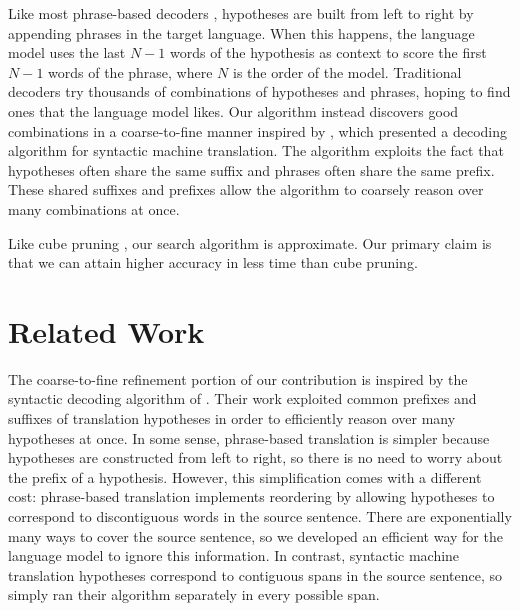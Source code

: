\documentclass[11pt]{article}
\begin{document}
Like most phrase-based decoders \cite{pharaoh}, hypotheses are built from left to right by appending phrases in the target language.  When this happens, the language model uses the last $N-1$ words of the hypothesis as context to score the first $N-1$ words of the phrase, where $N$ is the order of the model.  Traditional decoders \cite{cubit} try thousands of combinations of hypotheses and phrases, hoping to find ones that the language model likes.  Our algorithm instead discovers good combinations in a coarse-to-fine manner inspired by , which presented a decoding algorithm for syntactic machine translation.  The algorithm exploits the fact that hypotheses often share the same suffix and phrases often share the same prefix.  These shared suffixes and prefixes allow the algorithm to coarsely reason over many combinations at once.   


Like cube pruning \cite{cubit}, our search algorithm is approximate.  Our primary claim is that we can attain higher accuracy in less time than cube pruning.  

\section{Related Work}
The coarse-to-fine refinement portion of our contribution is inspired by the syntactic decoding algorithm of .  Their work exploited common prefixes and suffixes of translation hypotheses in order to efficiently reason over many hypotheses at once.  In some sense, phrase-based translation is simpler because hypotheses are constructed from left to right, so there is no need to worry about the prefix of a hypothesis.  However, this simplification comes with a different cost: phrase-based translation implements reordering by allowing hypotheses to correspond to discontiguous words in the source sentence.  There are exponentially many ways to cover the source sentence, so we developed an efficient way for the language model to ignore this information.  In contrast, syntactic machine translation hypotheses correspond to contiguous spans in the source sentence, so  simply ran their algorithm separately in every possible span.  
\end{document}
